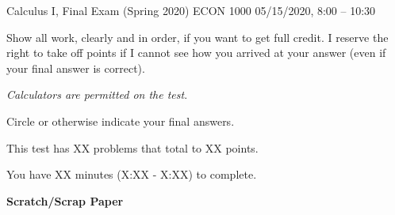 \documentclass[11pt,a4paper]{exam}
\begin{document}
%
%
%
\cover
{Calculus I,  Final Exam (Spring 2020)}      %
{ECON 1000}                                 %
{05/15/2020, 8:00 -- 10:30}                 %


\begin{examinfo}                        %
	\item  Show all work, clearly and in order, if you want to get full
	credit.  I reserve the right to take off points if I cannot see how you 
	arrived at your answer (even if your final answer is correct).
	\item \emph{Calculators are permitted on the test}.
	\item  Circle or otherwise indicate your final answers.
	\item  This test has XX problems that total to XX points. 
	\item You have XX minutes (X:XX - X:XX) to complete.
\end{examinfo}
\clearpage



%
%


%
%


%
%

\clearpage


\clearpage 




\bf{Scratch/Scrap Paper}
\end{document}
